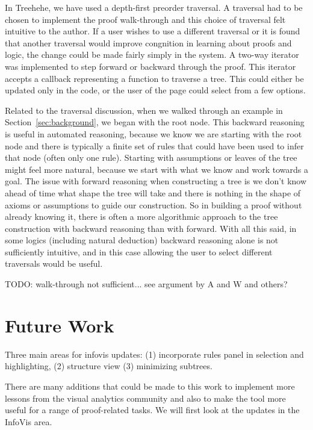 \documentclass[conference]{IEEEtran}
\newcommand{\projectname}{Treehehe}
\begin{document}
In \projectname{}, we have used a depth-first preorder traversal. A traversal had to be chosen to implement the proof walk-through and this choice of traversal felt intuitive to the author. If a user wishes to use a different traversal or it is found that another traversal would improve congnition in learning about proofs and logic, the change could be made fairly simply in the system. A two-way iterator was implemented to step forward or backward through the proof. This iterator accepts a callback representing a function to traverse a tree. This could either be updated only in the code, or the user of the page could select from a few options.

Related to the traversal discussion, when we walked through an example in Section~\ref{sec:background}, we began with the root node. This backward reasoning is useful in automated reasoning, because we know we are starting with the root node and there is typically a finite set of rules that could have been used to infer that node (often only one rule). Starting with assumptions or leaves of the tree might feel more natural, because we start with what we know and work towards a goal. The issue with forward reasoning when constructing a tree is we don't know ahead of time what shape the tree will take and there is nothing in the shape of axioms or assumptions to guide our construction. So in building a proof without already knowing it, there is often a more algorithmic approach to the tree construction with backward reasoning than with forward. With all this said, in some logics (including natural deduction) backward reasoning alone is not sufficiently intuitive, and in this case allowing the user to select different traversals would be useful.

TODO: walk-through not sufficient... see argument by A and W and others?


\section{Future Work}
\label{sec:future}

Three main areas for infovis updates: (1) incorporate rules panel in selection and highlighting, (2) structure view (3) minimizing subtrees.

There are many additions that could be made to this work to implement more lessons from the visual analytics community and also to make the tool more useful for a range of proof-related tasks. We will first look at the updates in the InfoVis area.
\end{document}
